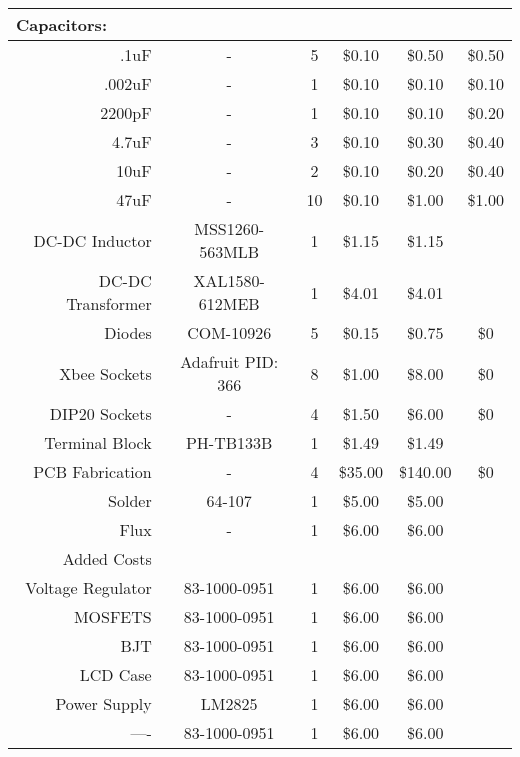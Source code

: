 \begin{center}
\begin{tabular}{|r|c|c|c|c|c|}
\hline
\multicolumn{1}{|l|}{Capacitors:} &   &   &   &  &\\
\hline
{.1uF} & - & 5 & \$0.10 & \$0.50 & \$0.50\\
\hline
{.002uF} & - & 1 & \$0.10 & \$0.10 & \$0.10\\
\hline
{2200pF} & - & 1 & \$0.10 & \$0.10 & \$0.20\\
\hline
{4.7uF} & - & 3 & \$0.10 & \$0.30 & \$0.40\\
\hline
{10uF} & - & 2 & \$0.10 & \$0.20 & \$0.40\\
\hline
{47uF} & - & 10 & \$0.10 & \$1.00 & \$1.00\\
\hline
DC-DC Inductor & MSS1260-563MLB & 1 & \$1.15 & \$1.15 &\\
\hline
DC-DC Transformer & XAL1580-612MEB & 1 & \$4.01 & \$4.01 &\\
\hline
{Diodes} & COM-10926 & 5 & \$0.15 & \$0.75 & \$0\\
\hline
{Xbee Sockets} & Adafruit PID: 366 & 8 & \$1.00 & \$8.00 & \$0\\
\hline
{DIP20 Sockets} & - & 4 & \$1.50 & \$6.00 & \$0\\
\hline
{Terminal Block} & PH-TB133B & 1 & \$1.49 & \$1.49 &\\
\hline
{PCB Fabrication} & - & 4 & \$35.00 & \$140.00 & \$0\\
\hline
{Solder} & 64-107 & 1 & \$5.00 & \$5.00 &\\
\hline
{Flux} & - & 1 & \$6.00 & \$6.00 &\\
\hline
{Added Costs} &  &  &  &  &\\
\hline
\hline
{Voltage Regulator} & 83-1000-0951 & 1 & \$6.00 & \$6.00 &\\
\hline
{MOSFETS} & 83-1000-0951 & 1 & \$6.00 & \$6.00 &\\
\hline
{BJT} & 83-1000-0951 & 1 & \$6.00 & \$6.00 &\\
\hline
{LCD Case} & 83-1000-0951 & 1 & \$6.00 & \$6.00 &\\
\hline
{Power Supply} & LM2825 & 1 & \$6.00 & \$6.00 &\\
\hline
{----} & 83-1000-0951 & 1 & \$6.00 & \$6.00 &\\
\hline
\end{tabular}%
\end{center}



